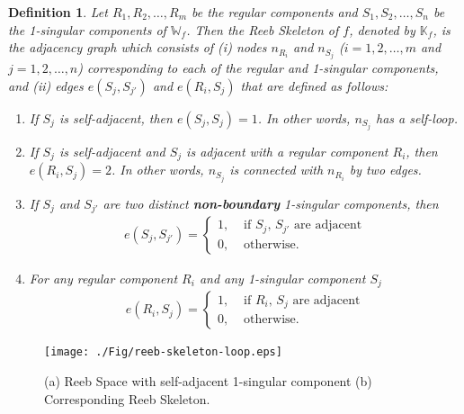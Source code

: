 \documentclass[twocolumn]{article}
\newcommand{\RS}{\mathbb{W}_f}
\newcommand{\RK}{\mathbb{K}_f}
\newtheorem{dfn}{Definition}[section]
\begin{document}
\begin{dfn}
\label{dfn:reeb-skeleton}
 Let $R_1, R_2, \ldots, R_m$ be the regular components and $S_1, S_2,
 \ldots, S_n$ be the 1-singular components of $\RS$. Then
the Reeb Skeleton of $f$, denoted by $\RK$, is the adjacency graph which consists of
(i) nodes  $n_{R_i}$ and $n_{S_j}$ ($i=1, 2, \ldots, m$ and $j=1, 2,
\ldots, n$) corresponding to each of the regular and 1-singular
components,  and (ii) edges $e(S_j, S_{j'})$ and $e(R_i, S_j)$ that are
defined as follows:
\begin{enumerate}
\item If $S_j$ is self-adjacent, then $e(S_j, S_j)=1$. In other words, $n_{S_j}$ has
a self-loop.
\item If $S_j$ is self-adjacent and $S_j$ is adjacent with a regular component $R_i$, then
$e(R_i, S_j)=2$. In other words, $n_{S_j}$ is connected with $n_{R_i}$ by two edges.
\item If $S_j$ and $S_{j'}$ are two distinct \textbf{non-boundary}
  1-singular components, then
\begin{align*}
e(S_j, S_{j'})=\left\{
\begin{array}{ccc}
1, & \text{ if } S_j,\, S_{j'} \text{ are adjacent}\\
0, & \text{ otherwise.}
\end{array}\right.
\end{align*}
\item For any regular component $R_i$ and any 1-singular component $S_j$
\begin{align*}
e(R_i, S_j)=\left\{
\begin{array}{ccc}
1, & \text{ if } R_i,\, S_j \text{ are adjacent}\\
0, & \text{ otherwise.}
\end{array}\right.
\end{align*}
\end{enumerate}
\end{dfn}
\begin{figure}[t!]
\begin{center}
\texttt{[image: ./Fig/reeb-skeleton-loop.eps]}
\end{center}
\vspace*{-2ex}
\caption{(a) Reeb Space with self-adjacent 1-singular component (b)
  Corresponding Reeb Skeleton.}
\label{fig:reeb-skeleton2}
\end{figure}
\end{document}
